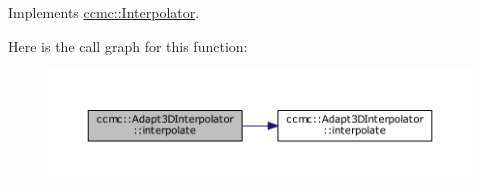 Implements \hyperlink{classccmc_1_1_interpolator_a6bfe1b4075f03704b893bb96e1675a3b}{ccmc\-::\-Interpolator}.



Here is the call graph for this function\-:
\nopagebreak
\begin{figure}[H]
\begin{center}
\leavevmode
\includegraphics[width=350pt]{classccmc_1_1_adapt3_d_interpolator_ad6f6e98e2070f7bf9f99be40c127548f_cgraph}
\end{center}
\end{figure}


